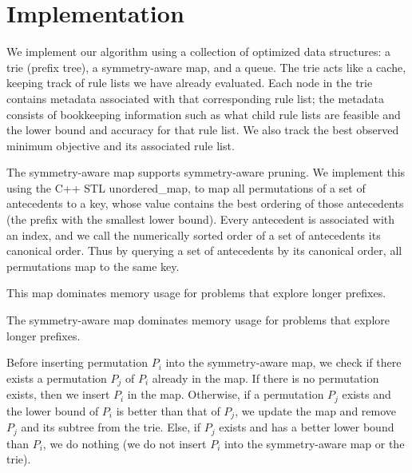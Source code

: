 \section{Implementation}
\label{sec:implementation}



We implement our algorithm using a collection of optimized data structures:
a trie (prefix tree), a symmetry-aware map, and a queue.
The trie acts like a cache, keeping track of rule lists we have already evaluated.
Each node in the trie contains metadata associated with that corresponding rule list;
the metadata consists of bookkeeping information such as what child rule lists are feasible and
the lower bound and accuracy for that rule list.
We also track the best observed minimum objective and its associated rule list.

The symmetry-aware map supports symmetry-aware pruning.
%
We implement this using the C++ STL unordered\_map,
to map all permutations of a set of antecedents to a key, whose value
contains the best ordering of those antecedents (\ie the prefix with the smallest lower bound).
%
Every antecedent is associated with an index, and we call the numerically
sorted order of a set of antecedents its canonical order.
%
Thus by querying a set of antecedents by its canonical order, all
permutations map to the same key.
%
%
\begin{kdd}
This map dominates memory usage for problems that explore longer prefixes.
\end{kdd}
\begin{arxiv}
The symmetry-aware map dominates memory usage for problems that explore longer prefixes.
\end{arxiv}
%
Before inserting permutation $P_i$ into the symmetry-aware map, we check
if there exists a permutation $P_j$ of $P_i$ already in the map.
If there is no permutation exists, then we insert $P_i$ in the map.
Otherwise, if a permutation $P_j$ exists and the lower bound of $P_i$ is better than 
that of $P_j$, we update the map and remove $P_j$ and its subtree from the trie.
Else, if $P_j$ exists and has a better lower bound than $P_i$, we do nothing 
(\ie we do not insert $P_i$ into the symmetry-aware map or the trie).

